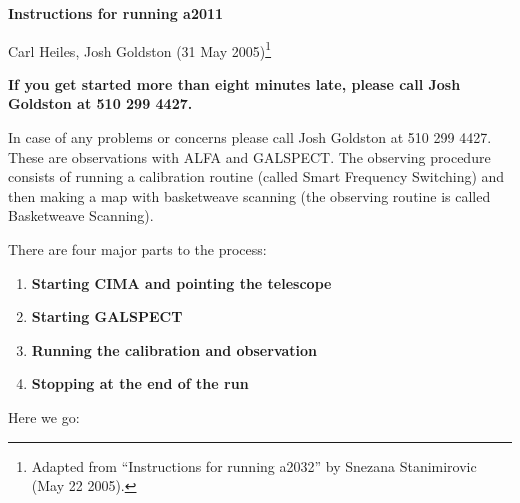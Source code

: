\setlength{\textheight}{21.5cm}
\setlength{\textwidth}{7in}
\setlength{\topmargin}{-0.25in}
\setlength{\oddsidemargin}{-0.25in}
\setlength{\evensidemargin}{0mm}
\setlength{\parindent}{0em}
\setlength{\headsep}{10.0mm}

\def\baselinestretch{1.0}
\pagestyle{myheadings}
\def\kms{km~s$^{-1}$}


\parskip 5pt
\begin{center}
  {\Large \bf Instructions for running a2011}

\vspace{0.5cm} {\large Carl Heiles, Josh Goldston 
(31 May 2005)\footnote{Adapted from
``Instructions for running a2032'' by Snezana Stanimirovic (May 22 2005).}}
\end{center}

{\bf If you get started more than eight minutes late, please call Josh
Goldston at 510 299 4427.}

In case of any problems or concerns please call Josh Goldston at 510 299
4427.  These are observations with ALFA and GALSPECT.  The observing
procedure consists of running a calibration routine (called Smart
Frequency Switching) and then making a map with basketweave scanning
(the observing routine is called Basketweave Scanning). 




There are four major parts to the process:
\begin{enumerate}

\item {\bf Starting CIMA and pointing the telescope}

\item {\bf Starting GALSPECT}

\item {\bf Running the calibration and observation}

\item {\bf Stopping at the end of the run}
\end{enumerate}


Here we go:

